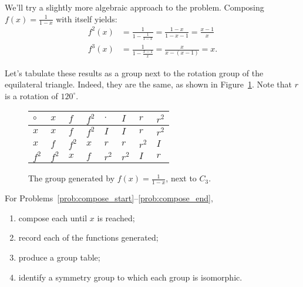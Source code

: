 \documentclass[../textbook.tex]{subfiles}
\begin{document}
\noindent We'll try a slightly more algebraic approach to the problem. Composing $f(x)=\frac{1}{1-x}$ with itself yields:
\begin{align*}
f^2(x)&=\frac{1}{1-\frac{1}{1-x}}=\frac{1-x}{1-x-1}=\frac{x-1}{x} \\
f^3(x)&=\frac{1}{1-\frac{x-1}{x}}=\frac{x}{x-(x-1)}=x.
\end{align*}

\noindent Let's tabulate these results as a group next to the rotation group of the equilateral triangle. Indeed, they are the same, as shown in Figure~\ref{fig:vs_cyclic_3}. Note that $r$ is a rotation of $120^\circ$.

\begin{figure}[h]
	\begin{center}
		\begin{minipage}[b]{\textwidth}
			\centering
			\begin{tabular}{l|lll||l|lll}
				\hline
				$\circ$  & $x$   & $f$   & $f^2$ & $\cdot$ & $I$   & $r$   & $r^2$ \\ \hline
				\rowcolor{light-gray}
				$x$   & $x$   & $f$   & $f^2$ & $I$   & $I$   & $r$   & $r^2$ \\
				$x$   & $f$   & $f^2$ & $x$   & $r$   & $r$   & $r^2$ & $I$   \\
				\rowcolor{light-gray}
				$f^2$ & $f^2$ & $x$   & $f$   & $r^2$ & $r^2$ & $I$   & $r$   \\ \hline
			\end{tabular}
			\vspace*{0.5\baselineskip}
		\end{minipage}
	\end{center}
	\vspace*{-2\baselineskip}
	\begin{center}
		\begin{minipage}[t]{\textwidth}
			\caption{The group generated by $f(x)=\frac{1}{1-x}$, next to $C_3$.}
			\label{fig:vs_cyclic_3}
		\end{minipage}
	\end{center}
	\vspace*{-2\baselineskip}
\end{figure}

For Problems~\ref{prob:compose_start}--\ref{prob:compose_end},
\begin{enumerate}[label=\roman*.]
\item compose each until $x$ is reached;
\item record each of the functions generated;
\item produce a group table;
\item identify a symmetry group to which each group is isomorphic.
\end{enumerate}
\end{document}
